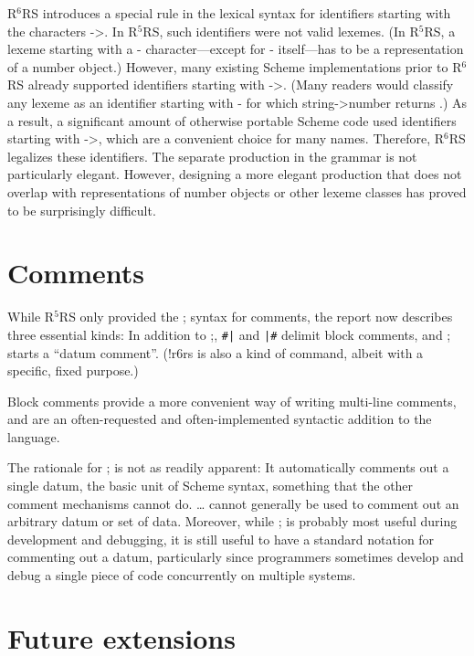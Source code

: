 \documentclass[twoside,twocolumn]{algol60}
\newcommand{\rn}[1]{R$^{#1}$RS}
\begin{document}
\rn{6} introduces a special rule in the lexical syntax for
identifiers starting with the characters {\cf ->}.  In \rn{5}, such
identifiers were not valid lexemes.  (In \rn{5}, a lexeme starting
with a {\cf -} character---except for {\cf -} itself---has to be a
representation of a number object.)
However, many existing
Scheme implementations prior to \rn{6} already supported identifiers
starting with {\cf ->}.  (Many readers would classify any lexeme as an
identifier starting with {\cf -} for which {\cf string->number}
returns \schfalse{}.)  As a result, a significant amount of otherwise
portable Scheme code used identifiers starting with {\cf ->}, which
are a convenient choice for many names.  Therefore, \rn{6} legalizes
these identifiers.  The separate production in the grammar is not particularly elegant.
However, designing a more elegant production that does not overlap with
representations of number objects or other lexeme classes has proved to be surprisingly
difficult.

 
\section{Comments}

While \rn{5} only provided the {\cf;} syntax for comments, the report
now describes three essential kinds: In addition to {\cf;}, {\tt \#|}
and {\tt |\#} delimit block comments, and {\cf\sharpsign;} starts a
``datum comment''.  ({\cf\sharpsign!r6rs} is also a kind of command,
albeit with a specific, fixed purpose.) 

Block comments provide a more convenient way of writing multi-line
comments, and are an often-requested and often-implemented syntactic
addition to the language. 

The rationale for {\cf\sharpsign;} is not as readily apparent: It
automatically comments out a single datum, the basic unit of Scheme
syntax, something that the other comment mechanisms cannot do.  {\cf
  \sharpsign\verticalbar} \ldots {\cf \verticalbar\sharpsign} cannot
generally be used to comment out an arbitrary datum or set of data.
Moreover, while {\cf\sharpsign;} is probably most useful during
development and debugging, it is still useful to have a standard
notation for commenting out a datum, particularly since programmers
sometimes develop and debug a single piece of code concurrently on
multiple systems.

\section{Future extensions}
\end{document}

